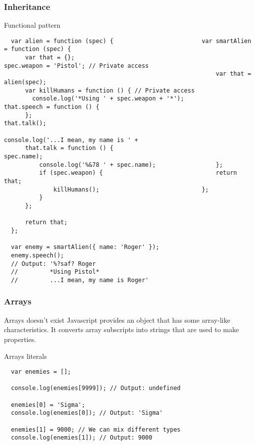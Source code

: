 \begin{frame}[fragile]
  \frametitle{Inheritance}

  \begin{block}{Functional pattern}
  {\tiny
  \begin{verbatim}
  var alien = function (spec) {                         var smartAlien = function (spec) {
      var that = {};                                        spec.weapon = 'Pistol'; // Private access
                                                            var that = alien(spec);
      var killHumans = function () { // Private access                                                             
        console.log('*Using ' + spec.weapon + '*');         that.speech = function () {
      };                                                        that.talk();
                                                                console.log('...I mean, my name is ' +
      that.talk = function () {                                   spec.name);
          console.log('%&78 ' + spec.name);                 };                                                       
          if (spec.weapon) {                                return that;
              killHumans();                             };
          }
      };

      return that;
  };

  var enemy = smartAlien({ name: 'Roger' });
  enemy.speech(); 
  // Output: '%?saf? Roger
  //         *Using Pistol*
  //         ...I mean, my name is Roger'
  \end{verbatim}
  }
  \end{block}
\end{frame}

\begin{frame}[fragile]
  \frametitle{Arrays}

  \begin{block}{Arrays doesn't exist}
  Javascript provides an object that has some array-like characteristics. It converts array subscripts into strings that are used to make properties.
  \end{block}

  \pause

  \begin{block}{Arrays literals}
  {\scriptsize
  \begin{verbatim}
  var enemies = [];

  console.log(enemies[9999]); // Output: undefined

  enemies[0] = 'Sigma';
  console.log(enemies[0]); // Output: 'Sigma'

  enemies[1] = 9000; // We can mix different types
  console.log(enemies[1]); // Output: 9000

  \end{verbatim}
  }
  \end{block}
\end{frame}


